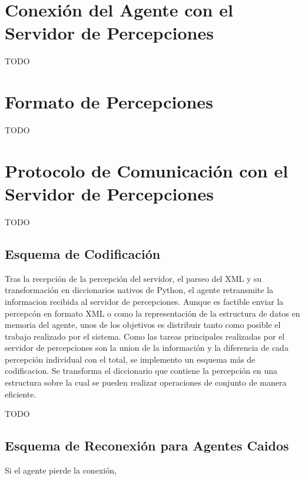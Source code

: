 \section[Conexión con el Percept Server]
{Conexión del Agente con el Servidor de Percepciones}
\label{sec:conexion}

 TODO

\section{Formato de Percepciones}
\label{sec:formato_percepciones}

 TODO

\section[Protocolo del Percept Server]
{Protocolo de Comunicación con el Servidor de Percepciones}
\label{sec:protocolo_perceptserver}

 TODO

\subsection{Esquema de Codificación}
\label{sub:esquema_codificacion}

 Tras la recepción de la percepción del servidor, el parseo del XML y
 su transformación en diccionarios nativos de Python, el agente
 retransmite la informacion recibida al servidor de percepciones.
 Aunque es factible enviar la percepcón en formato XML o como la
 representación de la estructura de datos en memoria del agente, unos
 de los objetivos es distribuir tanto como posible el trabajo realizado
 por el sistema.
 Como las tareas principales realizadas por el servidor de percepciones 
 son la union de la información y la diferencia de cada percepción 
 individual con el total, se implemento un esquema más de codificacion. 
 Se transforma el diccionario que contiene la percepción en una 
 estructura sobre la cual se pueden realizar operaciones de conjunto de 
 manera eficiente. 

 TODO

\subsection{Esquema de Reconexión para Agentes Caidos}
\label{sub:esquema_reconexion}
 
 Si el agente pierde la conexión, 
